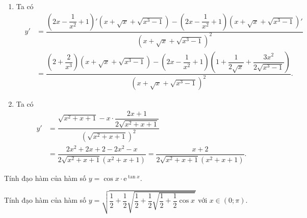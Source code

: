 \begin{ex}
{\begin{enumerate}
\begin{eqnarray*}
		\end{eqnarray*}
		 \item Ta có
		\begin{eqnarray*}
			&y'&=\dfrac{\left(2x-\dfrac{1}{x^2}+1\right)'\left(x+\sqrt x+\sqrt{x^3-1}\right)-\left(2x-\dfrac{1}{x^2}+1\right){\left(x+\sqrt x+\sqrt{x^3-1}\right)'}}{\left(x+\sqrt  x+\sqrt{x^3-1}\right)^2}\\
			& &=\dfrac{\left(2+\dfrac{2}{x^3}\right)\left(x+\sqrt x+\sqrt{x^3-1}\right)-\left(2x-\dfrac{1}{x^2}+1\right)\left(1+\dfrac{1}{2\sqrt x}+\dfrac{3x^2}{2\sqrt{x^3-1}}\right)}{\left(x+\sqrt  x+\sqrt{x^3-1}\right)^2}.
		\end{eqnarray*}
		\item Ta  có
		\begin{eqnarray*}
			&y'&=\dfrac{\sqrt{x^2+x+1}-x\cdot \dfrac{2x+1}{2\sqrt{x^2+x+1}}}{\left(\sqrt{x^2+x+1}\right)^2}\\ 
			& &=\dfrac{2x^2+2x+2-2x^2-x}{2\sqrt{x^2+x+1}\left(x^2+x+1\right)}=\dfrac{x+2}{2\sqrt{x^2+x+1}\left(x^2+x+1\right)}. 
		\end{eqnarray*}
\end{enumerate}}
\end{ex}

\begin{ex}%
	Tính đạo hàm  của hàm số $y=\cos x \cdot \mathrm{e}^{\tan x}$.
\end{ex}

\begin{ex}%
	 Tính đạo hàm của hàm số
	$ y=\sqrt{\dfrac{1}{2}+\dfrac{1}{2}\sqrt{\dfrac{1}{2}+\dfrac{1}{2}\sqrt{\dfrac{1}{2}+\dfrac{1}{2}\cos x}}}$ với  $x\in (0;\pi)$.
\end{ex}

